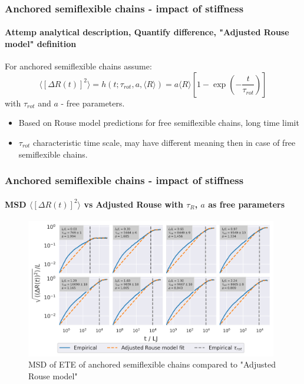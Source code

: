 \documentclass[handout]{beamer}
\newcommand{\mean}[1]{\langle #1 \rangle}
\newcommand{\E}[1]{\langle#1\rangle}
\begin{document}
\begin{frame}
    \frametitle{Anchored semiflexible chains - impact of stiffness}
    \framesubtitle{Attemp analytical description, Quantify difference, "Adjusted Rouse model" definition}
    For anchored semiflexible chains assume:
    $$ \mean{[\Delta R(t)]^2} = h(t; \tau_{rot}, a, \E{R}) = a \mean{R} [1 - \exp(-\frac{t}{\tau_{rot}})]$$
    with $\tau_{rot}$ and $a$ - free parameters.
    \begin{itemize}
        \item Based on Rouse model predictions for free semiflexible chains, 
        long time limit
        \item $\tau_{rot}$ characteristic time scale, may have different meaning
        then in case of free semiflexible chains.
    \end{itemize}
\end{frame}


\begin{frame}
    \frametitle{Anchored semiflexible chains - impact of stiffness}
    \framesubtitle{MSD $\mean{[\Delta R(t)]^2}$ vs Adjusted Rouse with $\tau_R$, $a$ as free parameters}
    \begin{figure}[h]
        \includegraphics[width=11cm]{4-exp-delta_R-rouse_fit-tau-a_log.png}
        \caption{MSD of ETE of anchored semiflexible chains compared to 
        "Adjusted Rouse model"}
    \end{figure}
\end{frame}

\end{document}
